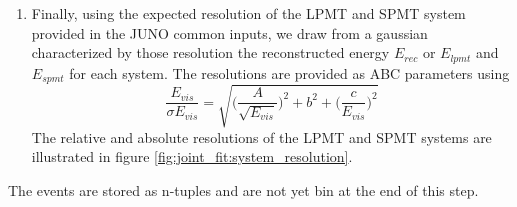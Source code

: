 \documentclass[../main.tex]{subfiles}
\begin{document}
\begin{enumerate}
  \item Finally, using the expected resolution of the LPMT and SPMT system provided in the JUNO common inputs, we draw from a gaussian characterized by those resolution the reconstructed energy $E_{rec}$ or $E_{lpmt}$ and $E_{spmt}$ for each system. The resolutions are provided as ABC parameters using
    \begin{equation}
      \frac{E_{vis}}{\sigma E_{vis}} = \sqrt{\bigg(\frac{A}{\sqrt{E_{vis}}}\bigg)^2 + b^2 + \bigg(\frac{c}{E_{vis}}\bigg)^2}
    \end{equation}
    The relative and absolute resolutions of the LPMT and SPMT systems are illustrated in figure \ref{fig:joint_fit:system_resolution}.
\end{enumerate}

The events are stored as n-tuples and are not yet bin at the end of this step.
\end{document}
